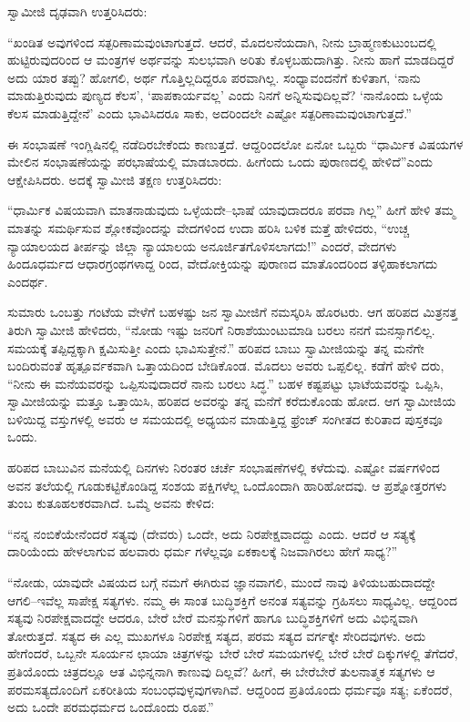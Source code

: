 ಸ್ವಾಮೀಜಿ ದೃಢವಾಗಿ ಉತ್ತರಿಸಿದರು:

“ಖಂಡಿತ ಅವುಗಳಿಂದ ಸತ್ಪರಿಣಾಮವುಂಟಾಗುತ್ತದೆ. ಆದರೆ, ಮೊದಲನೆಯದಾಗಿ, ನೀನು ಬ್ರಾಹ್ಮಣಕುಟುಂಬದಲ್ಲಿ ಹುಟ್ಟಿರುವುದರಿಂದ ಆ ಮಂತ್ರಗಳ ಅರ್ಥವನ್ನು ಸುಲಭವಾಗಿ ಅರಿತು ಕೊಳ್ಳಬಹುದಾಗಿತ್ತು. ನೀನು ಹಾಗೆ ಮಾಡದಿದ್ದರೆ ಅದು ಯಾರ ತಪ್ಪು? ಹೋಗಲಿ, ಅರ್ಥ ಗೊತ್ತಿಲ್ಲದಿದ್ದರೂ ಪರವಾಗಿಲ್ಲ. ಸಂಧ್ಯಾವಂದನೆಗೆ ಕುಳಿತಾಗ, ‘ನಾನು ಮಾಡುತ್ತಿರುವುದು ಪುಣ್ಯದ ಕೆಲಸ’, ‘ಪಾಪಕಾರ್ಯವಲ್ಲ’ ಎಂದು ನಿನಗೆ ಅನ್ನಿಸುವುದಿಲ್ಲವೆ? ‘ನಾನೊಂದು ಒಳ್ಳೆಯ ಕೆಲಸ ಮಾಡುತ್ತಿದ್ದೇನೆ’ ಎಂದು ಭಾವಿಸಿದರೂ ಸಾಕು, ಅದರಿಂದಲೇ ಎಷ್ಟೋ ಸತ್ಪರಿಣಾಮವುಂಟಾಗುತ್ತದೆ.”

ಈ ಸಂಭಾಷಣೆ ಇಂಗ್ಲಿಷಿನಲ್ಲಿ ನಡೆದಿರಬೇಕೆಂದು ಕಾಣುತ್ತದೆ. ಆದ್ದರಿಂದಲೋ ಏನೋ ಒಬ್ಬರು “ಧಾರ್ಮಿಕ ವಿಷಯಗಳ ಮೇಲಿನ ಸಂಭಾಷಣೆಯನ್ನು ಪರಭಾಷೆಯಲ್ಲಿ ಮಾಡಬಾರದು. ಹೀಗೆಂದು ಒಂದು ಪುರಾಣದಲ್ಲಿ ಹೇಳಿದೆ”ಎಂದು ಆಕ್ಷೇಪಿಸಿದರು. ಅದಕ್ಕೆ ಸ್ವಾಮೀಜಿ ತಕ್ಷಣ ಉತ್ತರಿಸಿದರು:

“ಧಾರ್ಮಿಕ ವಿಷಯವಾಗಿ ಮಾತನಾಡುವುದು ಒಳ್ಳೆಯದೇ–ಭಾಷೆ ಯಾವುದಾದರೂ ಪರವಾ ಗಿಲ್ಲ” ಹೀಗೆ ಹೇಳಿ ತಮ್ಮ ಮಾತನ್ನು ಸಮರ್ಥಿಸುವ ಶ್ಲೋಕವೊಂದನ್ನು ವೇದಗಳಿಂದ ಉದಾ ಹರಿಸಿ ಬಳಿಕ ಮತ್ತೆ ಹೇಳಿದರು, “ಉಚ್ಚ ನ್ಯಾಯಾಲಯದ ತೀರ್ಪನ್ನು ಜಿಲ್ಲಾ ನ್ಯಾಯಾಲಯ ಅನೂರ್ಜಿತಗೊಳಿಸಲಾಗದು!” ಎಂದರೆ, ವೇದಗಳು ಹಿಂದೂಧರ್ಮದ ಆಧಾರಗ್ರಂಥಗಳಾದ್ದ ರಿಂದ, ವೇದೋಕ್ತಿಯನ್ನು ಪುರಾಣದ ಮಾತೊಂದರಿಂದ ತಳ್ಳಿಹಾಕಲಾಗದು ಎಂದರ್ಥ.

ಸುಮಾರು ಒಂಬತ್ತು ಗಂಟೆಯ ವೇಳೆಗೆ ಬಹಳಷ್ಟು ಜನ ಸ್ವಾಮೀಜಿಗೆ ನಮಸ್ಕರಿಸಿ ಹೊರಟರು. ಆಗ ಹರಿಪದ ಮಿತ್ರನತ್ತ ತಿರುಗಿ ಸ್ವಾಮೀಜಿ ಹೇಳಿದರು, “ನೋಡು ಇಷ್ಟು ಜನರಿಗೆ ನಿರಾಶೆಯುಂಟುಮಾಡಿ ಬರಲು ನನಗೆ ಮನಸ್ಸಾಗಲಿಲ್ಲ. ಸಮಯಕ್ಕೆ ತಪ್ಪಿದ್ದಕ್ಕಾಗಿ ಕ್ಷಮಿಸುತ್ತೀ ಎಂದು ಭಾವಿಸುತ್ತೇನೆ.” ಹರಿಪದ ಬಾಬು ಸ್ವಾಮೀಜಿಯನ್ನು ತನ್ನ ಮನೆಗೇ ಬಂದಿರುವಂತೆ ಹೃತ್ಪೂರ್ವಕವಾಗಿ ಒತ್ತಾಯದಿಂದ ಬೇಡಿಕೊಂಡ. ಮೊದಲು ಅವರು ಒಪ್ಪಲಿಲ್ಲ. ಕಡೆಗೆ ಹೇಳಿ ದರು, “ನೀನು ಈ ಮನೆಯವರನ್ನು ಒಪ್ಪಿಸುವುದಾದರೆ ನಾನು ಬರಲು ಸಿದ್ಧ.” ಬಹಳ ಕಷ್ಟಪಟ್ಟು ಭಾಟೆಯವರನ್ನು ಒಪ್ಪಿಸಿ, ಸ್ವಾಮೀಜಿಯನ್ನು ಮತ್ತೂ ಒತ್ತಾಯಿಸಿ, ಹರಿಪದ ಅವರನ್ನು ತನ್ನ ಮನೆಗೆ ಕರೆದುಕೊಂಡು ಹೋದ. ಆಗ ಸ್ವಾಮೀಜಿಯ ಬಳಿಯಿದ್ದ ವಸ್ತುಗಳಲ್ಲಿ ಅವರು ಆ ಸಮಯದಲ್ಲಿ ಅಧ್ಯಯನ ಮಾಡುತ್ತಿದ್ದ ಫ್ರೆಂಚ್ ಸಂಗೀತದ ಕುರಿತಾದ ಪುಸ್ತಕವೂ ಒಂದು.

ಹರಿಪದ ಬಾಬುವಿನ ಮನೆಯಲ್ಲಿ ದಿನಗಳು ನಿರಂತರ ಚರ್ಚೆ ಸಂಭಾಷಣೆಗಳಲ್ಲಿ ಕಳೆದುವು. ಎಷ್ಟೋ ವರ್ಷಗಳಿಂದ ಅವನ ತಲೆಯಲ್ಲಿ ಗೂಡುಕಟ್ಟಿಕೊಂಡಿದ್ದ ಸಂಶಯ ಪಕ್ಷಿಗಳೆಲ್ಲ ಒಂದೊಂದಾಗಿ ಹಾರಿಹೋದವು. ಆ ಪ್ರಶ್ನೋತ್ತರಗಳು ತುಂಬ ಕುತೂಹಲಕರವಾಗಿದೆ. ಒಮ್ಮೆ ಅವನು ಕೇಳಿದ:

“ನನ್ನ ನಂಬಿಕೆಯೇನೆಂದರೆ ಸತ್ಯವು (ದೇವರು) ಒಂದೇ, ಅದು ನಿರಪೇಕ್ಷವಾದದ್ದು ಎಂದು. ಆದರೆ ಆ ಸತ್ಯಕ್ಕೆ ದಾರಿಯೆಂದು ಹೇಳಲಾಗುವ ಹಲವಾರು ಧರ್ಮ ಗಳೆಲ್ಲವೂ ಏಕಕಾಲಕ್ಕೆ ನಿಜವಾಗಿರಲು ಹೇಗೆ ಸಾಧ್ಯ?”

“ನೋಡು, ಯಾವುದೇ ವಿಷಯದ ಬಗ್ಗೆ ನಮಗೆ ಈಗಿರುವ ಜ್ಞಾನವಾಗಲಿ, ಮುಂದೆ ನಾವು ತಿಳಿಯಬಹುದಾದದ್ದೇ ಆಗಲಿ–ಇವೆಲ್ಲ ಸಾಪೇಕ್ಷ ಸತ್ಯಗಳು. ನಮ್ಮ ಈ ಸಾಂತ ಬುದ್ಧಿಶಕ್ತಿಗೆ ಅನಂತ ಸತ್ಯವನ್ನು ಗ್ರಹಿಸಲು ಸಾಧ್ಯವಿಲ್ಲ. ಆದ್ದರಿಂದ ಸತ್ಯವು ನಿರಪೇಕ್ಷವಾದದ್ದೇ ಆದರೂ, ಬೇರೆ ಬೇರೆ ಮನಸ್ಸುಗಳಿಗೆ ಹಾಗೂ ಬುದ್ಧಿಶಕ್ತಿಗಳಿಗೆ ಅದು ವಿಭಿನ್ನವಾಗಿ ತೋರುತ್ತದೆ. ಸತ್ಯದ ಈ ಎಲ್ಲ ಮುಖಗಳೂ ನಿರಪೇಕ್ಷ ಸತ್ಯದ, ಪರಮ ಸತ್ಯದ ವರ್ಗಕ್ಕೇ ಸೇರಿದವುಗಳು. ಅದು ಹೇಗೆಂದರೆ, ಒಬ್ಬನೇ ಸೂರ್ಯನ ಛಾಯಾ ಚಿತ್ರಗಳನ್ನು ಬೇರೆ ಬೇರೆ ಸಮಯಗಳಲ್ಲಿ ಬೇರೆ ಬೇರೆ ದಿಕ್ಕುಗಳಲ್ಲಿ ತೆಗೆದರೆ, ಪ್ರತಿಯೊಂದು ಚಿತ್ರದಲ್ಲೂ ಆತ ವಿಭಿನ್ನನಾಗಿ ಕಾಣುವು ದಿಲ್ಲವೆ? ಹೀಗೆ, ಈ ಬೇರೆಬೇರೆ ತುಲನಾತ್ಮಕ ಸತ್ಯಗಳು ಆ ಪರಮಸತ್ಯದೊಂದಿಗೆ ಏಕರೀತಿಯ ಸಂಬಂಧವುಳ್ಳವುಗಳಾಗಿವೆ. ಆದ್ದರಿಂದ ಪ್ರತಿಯೊಂದು ಧರ್ಮವೂ ಸತ್ಯ; ಏಕೆಂದರೆ, ಅದು ಒಂದೇ ಪರಮಧರ್ಮದ ಒಂದೊಂದು ರೂಪ.”

